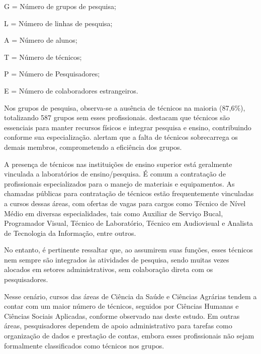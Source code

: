 \documentclass[portuguese]{textolivre}
\begin{document}
\begin{table}[htbp]
\begin{threeparttable}
\begin{tabular}{lllllll}
\bottomrule
\end{tabular}
\begin{tablenotes}
\footnotesize{
\item{G = Número de grupos de pesquisa;}
\item{L = Número de linhas de pesquisa;} 
\item{A = Número de alunos;}
\item{T = Número de técnicos;}
\item{P = Número de Pesquisadores;}
\item{E = Número de colaboradores estrangeiros.}
}
\end{tablenotes}
\end{threeparttable}
\end{table}


Nos grupos de pesquisa, observa-se a ausência de técnicos na maioria (87,6\%), totalizando 587 grupos sem esses profissionais. \textcite{nickel2016} destacam que técnicos são essenciais para manter recursos físicos e integrar pesquisa e ensino, contribuindo conforme sua especialização. \textcite{vilarino2017} alertam que a falta de técnicos sobrecarrega os demais membros, comprometendo a eficiência dos grupos.

A presença de técnicos nas instituições de ensino superior está geralmente vinculada a laboratórios de ensino/pesquisa. É comum a contratação de profissionais especializados para o manejo de materiais e equipamentos. As chamadas públicas para contratação de técnicos estão frequentemente vinculadas a cursos dessas áreas, com ofertas de vagas para cargos como Técnico de Nível Médio em diversas especialidades, tais como Auxiliar de Serviço Bucal, Programador Visual, Técnico de Laboratório, Técnico em Audiovisual e Analista de Tecnologia da Informação, entre outros.

No entanto, é pertinente ressaltar que, ao assumirem suas funções, esses técnicos nem sempre são integrados às atividades de pesquisa, sendo muitas vezes alocados em setores administrativos, sem colaboração direta com os pesquisadores.

Nesse cenário, cursos das áreas de Ciência da Saúde e Ciências Agrárias tendem a contar com um maior número de técnicos, seguidos por Ciências Humanas e Ciências Sociais Aplicadas, conforme observado nas  deste estudo. Em outras áreas, pesquisadores dependem de apoio administrativo para tarefas como organização de dados e prestação de contas, embora esses profissionais não sejam formalmente classificados como técnicos nos grupos.
\end{document}

